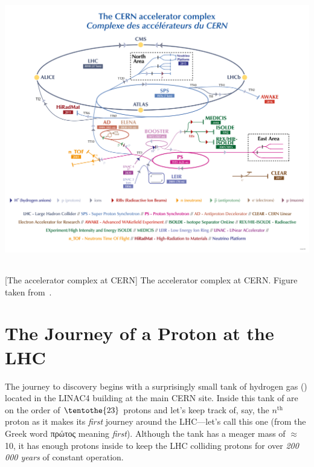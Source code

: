 \begin{multiFigure}
    \centering
    \includegraphics[height=12.5cm]{figures/lhc/cern_complex.png}
        [The accelerator complex at CERN]
        {The accelerator complex at CERN. Figure taken from~\cite{cern_complex}.}
    \label{fig:lhc_complex}
\end{multiFigure}

\section{The Journey of a Proton at the LHC}
The journey to discovery begins with a surprisingly small tank of hydrogen gas (\htwo) located in the LINAC4 building at the main CERN site.
Inside this tank of \htwo are on the order of $\tentothe{23}$ protons and let's keep track of, say, the $n^\text{th}$ proton as it makes its \emph{first} journey around the LHC---let's call this one \pname (from the Greek word \textgreek{πρώτος} meaning \emph{first}).
Although the tank has a meager mass of 
$\approx$10\Kg,
it has enough protons inside to keep the LHC colliding protons for over \emph{200\,000 years} of constant operation.

